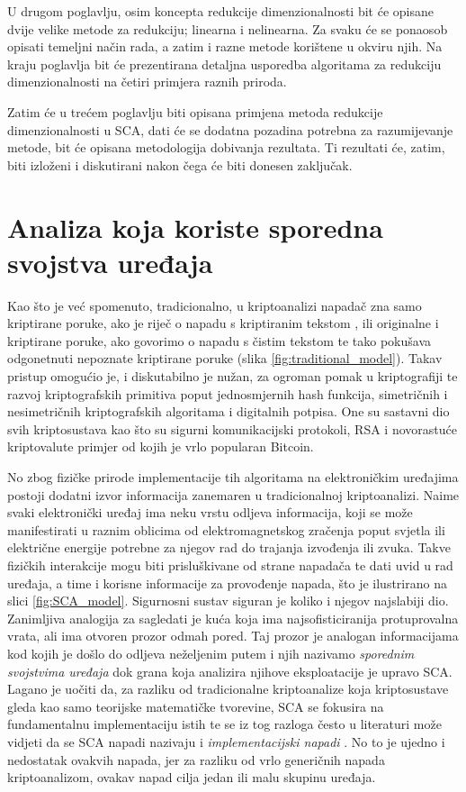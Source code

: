 \documentclass[times, utf8, diplomski]{fer}
\begin{document}
U drugom poglavlju, osim koncepta redukcije dimenzionalnosti bit će opisane dvije velike metode za redukciju; linearna i nelinearna. Za svaku će se ponaosob opisati temeljni način rada, a zatim i razne metode korištene u okviru njih. Na kraju poglavlja bit će prezentirana detaljna usporedba algoritama za redukciju dimenzionalnosti na četiri primjera raznih priroda.

Zatim će u trećem poglavlju biti opisana primjena metoda redukcije dimenzionalnosti u SCA, dati će se dodatna pozadina potrebna za razumijevanje metode, bit će opisana metodologija dobivanja rezultata. Ti rezultati će, zatim, biti izloženi i diskutirani nakon čega će biti donesen zaključak.

\chapter{Analiza koja koriste sporedna svojstva uređaja}

Kao što je već spomenuto, tradicionalno, u kriptoanalizi napadač  zna samo kriptirane poruke, ako je riječ o napadu s kriptiranim tekstom , ili originalne i kriptirane poruke, ako govorimo o napadu s čistim tekstom  te tako pokušava odgonetnuti nepoznate kriptirane poruke (slika \ref{fig:traditional_model}). Takav pristup omogućio je, i diskutabilno je nužan, za ogroman pomak u kriptografiji te razvoj kriptografskih primitiva poput jednosmjernih hash funkcija, simetričnih i nesimetričnih kriptografskih algoritama i digitalnih potpisa. One su sastavni dio svih kriptosustava kao što su sigurni komunikacijski protokoli, RSA i novorastuće kriptovalute primjer od kojih je vrlo popularan Bitcoin.

No zbog fizičke prirode implementacije tih algoritama na elektroničkim uređajima postoji dodatni izvor informacija zanemaren u tradicionalnoj kriptoanalizi. Naime svaki elektronički uređaj ima neku vrstu odljeva informacija, koji se može manifestirati u raznim oblicima od elektromagnetskog zračenja poput svjetla ili električne energije potrebne za njegov rad do trajanja izvođenja ili zvuka. Takve fizičkih interakcije mogu biti prisluškivane od strane napadača te dati uvid u rad uređaja, a time i korisne informacije za provođenje napada, što je ilustrirano na slici \ref{fig:SCA_model}. Sigurnosni sustav siguran je koliko i njegov najslabiji dio. Zanimljiva analogija za sagledati je kuća koja ima najsofisticiranija protuprovalna vrata, ali ima otvoren prozor odmah pored. Taj prozor je analogan informacijama kod kojih je došlo do odljeva neželjenim putem i njih nazivamo \emph{sporednim svojstvima uređaja}  dok grana koja analizira njihove eksploatacije je upravo SCA. Lagano je uočiti da, za razliku od tradicionalne kriptoanalize koja kriptosustave gleda kao samo teorijske matematičke tvorevine, SCA se fokusira na fundamentalnu implementaciju istih te se iz tog razloga često u literaturi može vidjeti da se SCA napadi nazivaju i \emph{implementacijski napadi} . No to je ujedno i nedostatak ovakvih napada, jer za razliku od vrlo generičnih napada kriptoanalizom, ovakav napad cilja jedan ili malu skupinu uređaja.
\end{document}

